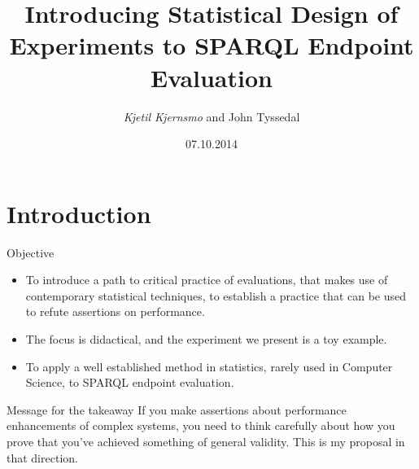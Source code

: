 \documentclass[english,usenames,dvipsnames,aspectratio=169]{beamer}
\begin{document}
\title[DoE in SPARQL Evaluations]{Introducing Statistical Design of Experiments to SPARQL Endpoint Evaluation}
\subtitle{}
\author{\emph{Kjetil Kjernsmo} and John Tyssedal}
\date{07.10.2014}
\maketitle

\section{Introduction} 

\begin{frame}{Objective}
  \begin{itemize}
  \item To introduce a path to critical practice of evaluations, that makes
use of contemporary statistical techniques, to establish a practice
that can be used to refute assertions on performance.
\item The focus is didactical, and the experiment we present is a toy
example.
\item To apply a well established method in statistics, rarely used in
  Computer Science, to SPARQL endpoint evaluation.

  \end{itemize}

  \begin{block}{Message for the takeaway}
    If you make assertions about performance enhancements of complex
    systems, you need to think carefully about how you prove that 
    you've achieved something of general validity. This is my proposal
    in that direction.
  \end{block}

\end{frame}
\end{document}
